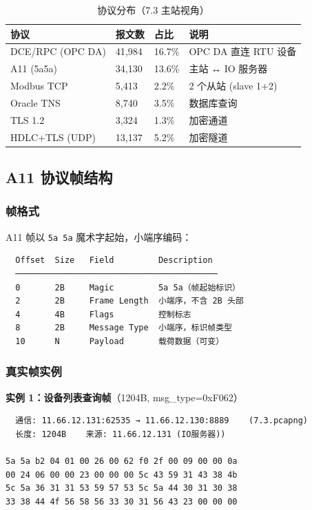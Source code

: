 \documentclass[12pt,a4paper]{ctexart}
\newcommand{\code}[1]{\texttt{\small #1}}
\begin{document}
\begin{table}[H]\centering
\caption{协议分布（7.3 主站视角）}
\begin{tabular}{p{3.5cm} p{2cm} p{2cm} p{5cm}}
\toprule
\textbf{协议} & \textbf{报文数} & \textbf{占比} & \textbf{说明} \\
\midrule
DCE/RPC (OPC DA) & 41,984 & 16.7\% & OPC DA 直连 RTU 设备 \\
A11 (5a5a) & 34,130 & 13.6\% & 主站 ↔ IO 服务器 \\
Modbus TCP & 5,413 & 2.2\% & 2 个从站 (slave 1+2) \\
Oracle TNS & 8,740 & 3.5\% & 数据库查询 \\
TLS 1.2 & 3,324 & 1.3\% & 加密通道 \\
HDLC+TLS (UDP) & 13,137 & 5.2\% & 加密隧道 \\
\bottomrule
\end{tabular}
\end{table}

\subsection{A11 协议帧结构}

\subsubsection{帧格式}

A11 帧以 \code{5a 5a} 魔术字起始，小端序编码：

\begin{verbatim}
  Offset  Size   Field         Description
  ─────────────────────────────────────────
  0       2B     Magic         5a 5a（帧起始标识）
  2       2B     Frame Length  小端序，不含 2B 头部
  4       4B     Flags         控制标志
  8       2B     Message Type  小端序，标识帧类型
  10      N      Payload       载荷数据（可变）
\end{verbatim}

\subsubsection{真实帧实例}

\textbf{实例 1：设备列表查询帧}（1204B, msg\_type=0xF062）

\begin{verbatim}
  通信: 11.66.12.131:62535 → 11.66.12.130:8889    (7.3.pcapng)
  长度: 1204B    来源: 11.66.12.131 (IO服务器))

5a 5a b2 04 01 00 26 00 62 f0 2f 00 09 00 00 0a
00 24 06 00 00 23 00 00 00 5c 43 59 31 43 38 4b
5c 5a 36 31 31 53 59 57 53 5c 5a 44 30 31 30 38
33 38 44 4f 56 58 56 33 30 31 56 43 23 00 00 00
\end{verbatim}
\end{document}

